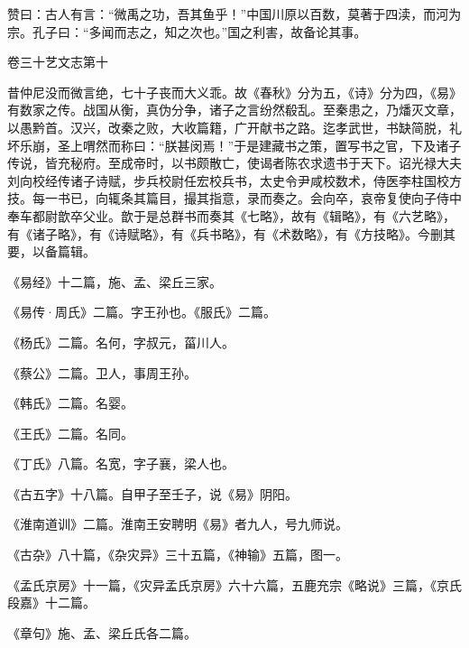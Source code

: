 \documentclass[12pt,UTF8]{ctexbook}
\begin{document}
赞曰：古人有言：“微禹之功，吾其鱼乎！”中国川原以百数，莫著于四渎，而河为宗。孔子曰：“多闻而志之，知之次也。”国之利害，故备论其事。





卷三十艺文志第十



昔仲尼没而微言绝，七十子丧而大义乖。故《春秋》分为五，《诗》分为四，《易》有数家之传。战国从衡，真伪分争，诸子之言纷然殽乱。至秦患之，乃燔灭文章，以愚黔首。汉兴，改秦之败，大收篇籍，广开献书之路。迄孝武世，书缺简脱，礼坏乐崩，圣上喟然而称曰：“朕甚闵焉！”于是建藏书之策，置写书之官，下及诸子传说，皆充秘府。至成帝时，以书颇散亡，使谒者陈农求遗书于天下。诏光禄大夫刘向校经传诸子诗赋，步兵校尉任宏校兵书，太史令尹咸校数术，侍医李柱国校方技。每一书已，向辄条其篇目，撮其指意，录而奏之。会向卒，哀帝复使向子侍中奉车都尉歆卒父业。歆于是总群书而奏其《七略》，故有《辑略》，有《六艺略》，有《诸子略》，有《诗赋略》，有《兵书略》，有《术数略》，有《方技略》。今删其要，以备篇辑。



《易经》十二篇，施、孟、梁丘三家。



《易传·周氏》二篇。字王孙也。《服氏》二篇。



《杨氏》二篇。名何，字叔元，菑川人。



《蔡公》二篇。卫人，事周王孙。



《韩氏》二篇。名婴。



《王氏》二篇。名同。



《丁氏》八篇。名宽，字子襄，梁人也。



《古五字》十八篇。自甲子至壬子，说《易》阴阳。



《淮南道训》二篇。淮南王安聘明《易》者九人，号九师说。



《古杂》八十篇，《杂灾异》三十五篇，《神输》五篇，图一。



《孟氏京房》十一篇，《灾异孟氏京房》六十六篇，五鹿充宗《略说》三篇，《京氏段嘉》十二篇。



《章句》施、孟、梁丘氏各二篇。
\end{document}
